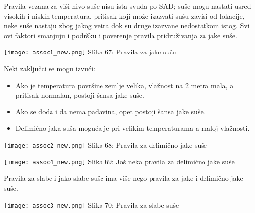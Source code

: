 \documentclass[a4paper]{article}
\begin{document}
{Pravila vezana za viši nivo suše nisu ista svuda po SAD; suše mogu nastati usred visokih i niskih temperatura, pritisak koji može izazvati sušu zavisi od lokacije, neke suše nastaju zbog jakog vetra dok su druge izazvane nedostatkom istog. Svi ovi faktori smanjuju i podršku i poverenje pravila pridruživanja za jake suše.\\

\noindent\begin{minipage}{1.0\textwidth}
\texttt{[image: assoc1\_new.png]}
\hphantom{aaaaaaaaaaaaaaaaaaaaaaaa}Slika 67: Pravila za jake suše\\
\end{minipage}

Neki zaključci se mogu izvući:
\begin{itemize}
\item Ako je temperatura površine zemlje velika, vlažnost na 2 metra mala, a pritisak normalan, postoji šansa jake suše.
\item Ako se doda i da nema padavina, opet postoji šansa jake suše.
\item Delimično jaka suša moguća je pri velikim temperaturama a maloj vlažnosti.\\
\end{itemize}

\noindent\begin{minipage}{1.0\textwidth}
\texttt{[image: assoc2\_new.png]}
\hphantom{aaaaaaaaaaaaaaaaa}Slika 68: Pravila za delimično jake suše\\
\end{minipage}

\noindent\begin{minipage}{1.0\textwidth}
\texttt{[image: assoc4\_new.png]}
\hphantom{aaaaaaaaaaaaaaa}Slika 69: Još neka pravila za delimično jake suše\\
\end{minipage}

Pravila za slabe i jako slabe suše ima više nego pravila za jake i delimično jake suše.\\

\noindent\begin{minipage}{1.0\textwidth}
\texttt{[image: assoc3\_new.png]}
\hphantom{aaaaaaaaaaaaaaaaaaaaaaa}Slika 70: Pravila za slabe suše\\
\end{minipage}

}
\end{document}
